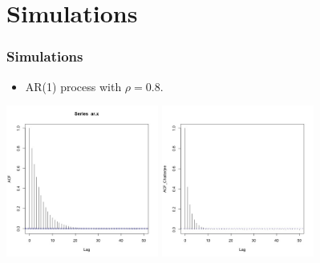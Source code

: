 \documentclass [xcolor=svgnames, t] {beamer}
\begin{document}
\section{Simulations}
\begin{frame}
    \frametitle{Simulations}
    \begin{itemize}
        \item AR(1) process with $\rho = 0.8$.
    \end{itemize}
    \vspace{2em}
    \centering
        \includegraphics[width=5cm]{acf_ar.jpg}
        \includegraphics[width=5cm]{acf_ar_chatterjee.jpg}
\end{frame}
\end{document}
